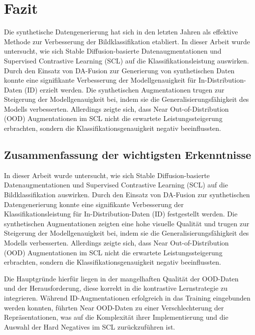 \chapter{Fazit} \label{ch:conclusion}

Die synthetische Datengenerierung hat sich in den letzten Jahren als effektive Methode zur Verbesserung der Bildklassifikation etabliert. In dieser Arbeit wurde untersucht, wie sich Stable Diffusion-basierte Datenaugmentationen und Supervised Contrastive Learning (SCL) auf die Klassifikationsleistung auswirken. Durch den Einsatz von DA-Fusion zur Generierung von synthetischen Daten konnte eine signifikante Verbesserung der Modellgenauigkeit für In-Distribution-Daten (ID) erzielt werden. Die synthetischen Augmentationen trugen zur Steigerung der Modellgenauigkeit bei, indem sie die Generalisierungsfähigkeit des Modells verbesserten. Allerdings zeigte sich, dass Near Out-of-Distribution (OOD) Augmentationen im SCL nicht die erwartete Leistungssteigerung erbrachten, sondern die Klassifikationsgenauigkeit negativ beeinflussten.

\section{Zusammenfassung der wichtigsten Erkenntnisse} \label{sec:summary}

In dieser Arbeit wurde untersucht, wie sich Stable Diffusion-basierte Datenaugmentationen und Supervised Contrastive Learning (SCL) auf die Bildklassifikation auswirken. Durch den Einsatz von DA-Fusion zur synthetischen Datengenerierung konnte eine signifikante Verbesserung der Klassifikationsleistung für In-Distribution-Daten (ID) festgestellt werden. Die synthetischen Augmentationen zeigten eine hohe visuelle Qualität und trugen zur Steigerung der Modellgenauigkeit bei, indem sie die Generalisierungsfähigkeit des Modells verbesserten. Allerdings zeigte sich, dass Near Out-of-Distribution (OOD) Augmentationen im SCL nicht die erwartete Leistungssteigerung erbrachten, sondern die Klassifikationsgenauigkeit negativ beeinflussten.

Die Hauptgründe hierfür liegen in der mangelhaften Qualität der OOD-Daten und der Herausforderung, diese korrekt in die kontrastive Lernstrategie zu integrieren. Während ID-Augmentationen erfolgreich in das Training eingebunden werden konnten, führten Near OOD-Daten zu einer Verschlechterung der Repräsentationen, was auf die Komplexität ihrer Implementierung und die Auswahl der Hard Negatives im SCL zurückzuführen ist.


